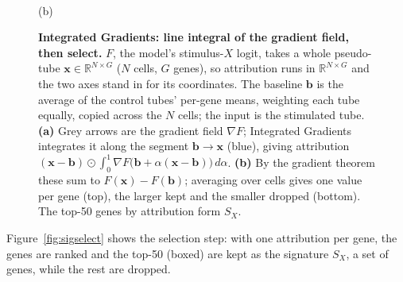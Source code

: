 \documentclass[11pt,a4paper]{article}
\newcommand{\rev}[1]{#1}  %
\begin{document}
\begin{figure}[H]
\begin{minipage}[c]{0.40\textwidth}
\\[2pt]
{\footnotesize (b)}
\end{minipage}
\caption{\textbf{Integrated Gradients: line integral of the gradient field, then select.}
$F$, the model's stimulus-$X$ logit, takes a whole pseudo-tube $\mathbf{x}\in\mathbb{R}^{N\times G}$
($N$ cells, $G$ genes), so attribution runs in $\mathbb{R}^{N\times G}$ and the two axes stand in
for its coordinates. The baseline $\mathbf{b}$ is the average of the control tubes' per-gene means,
weighting each tube equally, copied across the $N$ cells; the input is the stimulated tube. \textbf{(a)} Grey arrows are the gradient field $\nabla F$; Integrated
Gradients integrates it along the segment $\mathbf{b}\to\mathbf{x}$ (blue), giving attribution
$(\mathbf{x}-\mathbf{b})\odot\int_0^1\nabla F\big(\mathbf{b}+\alpha(\mathbf{x}-\mathbf{b})\big)\,d\alpha$.
\textbf{(b)} By the gradient theorem these sum to $F(\mathbf{x})-F(\mathbf{b})$; averaging over cells
gives one value per gene (top), the larger kept and the smaller dropped (bottom). The top-50 genes by
attribution form $S_X$.}
\label{fig:ig3}
\end{figure}

\rev{Figure~\ref{fig:sigselect} shows the selection step: with one attribution per gene, the genes are ranked and the top-50 (boxed) are kept as the signature $S_X$, a set of genes, while the rest are dropped.}
\end{document}
